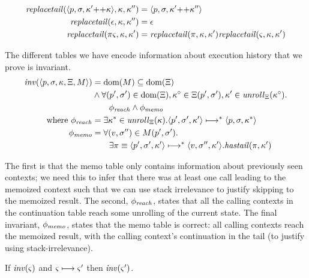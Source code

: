 \begin{align*}
  \mathit{replacetail}(\langle p,\sigma,\kappa' {\tt ++} \kappa \rangle,\kappa,\kappa'') &= \langle p,\sigma,\kappa' {\tt ++} \kappa'' \rangle \\
  \mathit{replacetail}(\epsilon,\kappa,\kappa'') &= \epsilon \\
  \mathit{replacetail}(\pi\varsigma,\kappa,\kappa') &= \mathit{replacetail}(\pi,\kappa,\kappa')\mathit{replacetail}(\varsigma,\kappa,\kappa') \\
\end{align*}

The different tables we have encode information about execution history that we prove is invariant.
\begin{align*}
  \mathit{inv}(\langle p, \sigma, \kappa, \Xi, M \rangle) &=
          \text{dom}(M) \subseteq \text{dom}(\Xi) \\
  &\wedge \forall (p',\sigma') \in \text{dom}(\Xi),
                  \kappa^\circ \in \Xi(p',\sigma'),
                  \kappa' \in \mathit{unroll}_{\Xi}(\kappa^\circ). \\   
  &\qquad \phi_{\mathit{reach}} \wedge \phi_{\mathit{memo}} \\
  \text{where } \phi_{\mathit{reach}} &=
  \exists \kappa^* \in \mathit{unroll}_{\Xi}(\kappa).
    \langle p', \sigma', \kappa' \rangle \longmapsto^* \langle p, \sigma, \kappa^* \rangle \\
  \phi_{\mathit{memo}} &=
 \forall (v, \sigma'') \in M(p',\sigma'). \\
  &\qquad \exists \pi\equiv\langle p', \sigma', \kappa' \rangle \longmapsto^* \langle v,\sigma'', \kappa' \rangle.
     \mathit{hastail}(\pi,\kappa') \\
\end{align*}

The first is that the memo table only contains information about previously seen contexts; we need this to infer that there was at least one call leading to the memoized context such that we can use stack irrelevance to justify skipping to the memoized result.
%
The second, $\phi_{\mathit{reach}}$, states that all the calling contexts in the continuation table reach some unrolling of the current state.
%
The final invariant, $\phi_{\mathit{memo}}$, states that the memo table is correct: all calling contexts reach the memoized result, with the calling context's continuation in the tail (to justify using stack-irrelevance).

\begin{lemma}\label{lem:tab-inv}
  If $\mathit{inv}(\varsigma)$ and $\varsigma \longmapsto \varsigma'$ then $\mathit{inv}(\varsigma')$.
\end{lemma}

